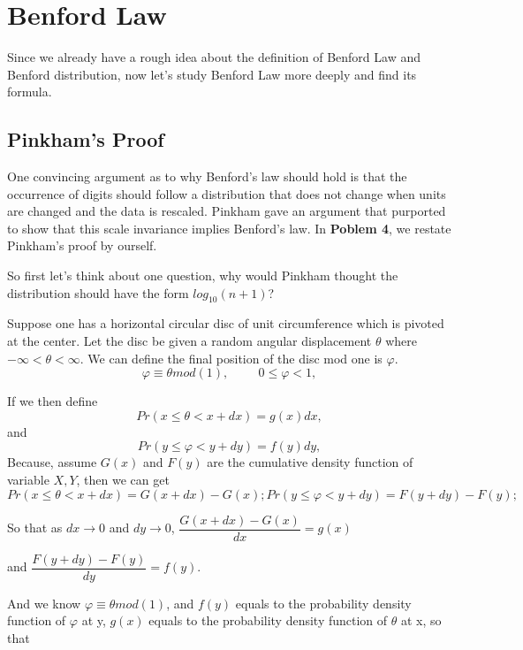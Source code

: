 \documentclass[12pt]{article}
\begin{document}
\section{Benford Law}
Since we already have a rough idea about the definition of Benford Law and Benford distribution, now let's study Benford Law more deeply and find its formula.
\subsection{Pinkham's Proof}
\par One convincing argument as to why Benford’s law should hold is that the occurrence of digits should
follow a distribution that does not change when units are changed and the data is rescaled. Pinkham
gave an argument that purported to show that this scale invariance implies Benford’s law. In \textbf{Poblem 4}, we restate Pinkham's proof by ourself.
\par
So first let's think about one question, why would Pinkham thought the distribution should have the form $log_{10}(n+1)$?
\par Suppose one has a horizontal circular disc of unit circumference which is pivoted at the center. Let the disc be given a random angular displacement $\theta$ where $-\infty <\theta<\infty$. We can define the final position of the disc mod one is $\varphi$.
\begin{equation*}
\varphi \equiv \theta mod(1),\hspace{1cm}0\leq\varphi<1,
\end{equation*}
\par If we then define
\begin{equation*}
Pr(x\leq\theta<x+dx)=g(x)dx,
\end{equation*}
and
\begin{equation*}
Pr(y\leq\varphi<y+dy)=f(y)dy,
\end{equation*}
Because, assume $G(x)$ and $F(y)$ are the cumulative density function of variable $X,Y$, then we can get
\begin{equation*}
Pr(x\leq\theta<x+dx)=G(x+dx)-G(x);
Pr(y\leq\varphi<y+dy)=F(y+dy)-F(y);
\end{equation*}
\par So that as $dx\rightarrow 0$ and $dy\rightarrow 0$, $\dfrac{G(x+dx)-G(x)}{dx}=g(x)$
\par and $\dfrac{F(y+dy)-F(y)}{dy}=f(y)$.
\par And we know $\varphi \equiv \theta mod(1)$, and $f(y)$ equals to the probability density function of $\varphi$ at y, $g(x)$ equals to the probability density function of $\theta$ at x, so that
\end{document}
